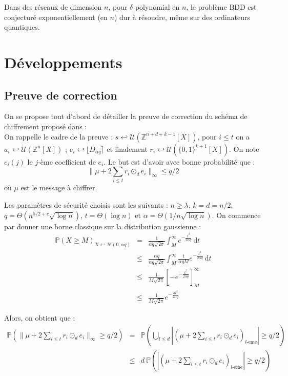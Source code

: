 \documentclass[11pt,a4paper]{article}
\begin{document}
\begin{conj}
Dans des réseaux de dimension $n$, pour $\delta$ polynomial en $n$, le problème BDD est conjecturé exponentiellement (en $n$) dur à résoudre, même sur des ordinateurs quantiques.
\end{conj}


\section{Développements}
\subsection{Preuve de correction}
On se propose tout d'abord de détailler la preuve de correction du schéma de chiffrement proposé dans \cite{mplwe} : \\

On rappelle le cadre de la preuve : $s \hookleftarrow \mathcal{U}(\mathbb{Z}^{n+d+k-1}[X])$, pour $i\leq t$ on a $a_i \hookleftarrow \mathcal{U}(\mathbb{Z}^n[X])$ ; $e_i \hookleftarrow \lfloor D_{\alpha q} \rceil$ et finalement $r_i \hookleftarrow \mathcal{U}(\{0,1\}^{k+1}[X])$. On note $e_i(j)$ le $j$-ème coefficient de $e_i$. Le but est d'avoir avec bonne probabilité que : 
\[\|\mu + 2\sum_{i \leq t}r_i \odot_d e_i  \|_\infty \leq q/2 \] où $\mu$ est le message à chiffrer. 

Les paramètres de sécurité choisis sont les suivants : 
$n \geq \lambda$, $k=d=n/2$, $q = \Theta(n^{5/2 + c}\sqrt{\log{n}})$, $t= \Theta(\log{n})$ et $\alpha = \Theta(1/n\sqrt{\log{n}})$. 
On commence par donner une borne classique sur la distribution gaussienne : 
\begin{eqnarray*}
\mathbb{P}(X \geq M)_{X \hookleftarrow \mathcal{N}(0,\alpha q)} &=& \frac{1}{\alpha q \sqrt{2 \pi}} \int_{M}^\infty e^{-\frac{t^2}{2 \alpha q}} \, \mathrm{d}t \\
&\leq &  \frac{\alpha q}{\alpha q \sqrt{2 \pi}}\int_{M}^\infty \frac{t}{\alpha q M} e^{-\frac{t^2}{2 \alpha q}} \, \mathrm{d}t \\
& \leq & \frac{1}{M \sqrt{2 \pi}} [-e^{-\frac{t^2}{2 \alpha q}}]_M^\infty \\
& \leq & \frac{1}{M \sqrt{2 \pi}} e^{-\frac{M^2}{2 \alpha q}}
\end{eqnarray*}

Alors, on obtient que : 
\begin{eqnarray*}
\mathbb{P}(\|\mu + 2\sum_{i \leq t}r_i \odot_d e_i  \|_\infty \geq q/2 ) &=& \mathbb{P}(\bigcup_{l\leq d} |(\mu + 2\sum_{i \leq t}r_i \odot_d e_i)_{l\text{-eme}}| \geq q/2 ) \\
&\leq& d \ \mathbb{P}(|(\mu + 2\sum_{i \leq t}r_i \odot_d e_i)_{l\text{-eme}}| \geq q/2 )
\end{eqnarray*}
\end{document}
